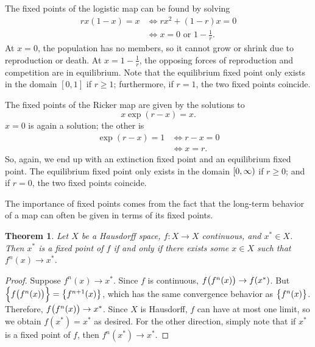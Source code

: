 \documentclass{article}
\theoremstyle{plain}
\newtheorem{theorem}{Theorem}
\theoremstyle{definition}
\DeclarePairedDelimiter{\parensproto}{\lparen}{\rparen}
\newcommand{\parens}{\parensproto*}
\DeclarePairedDelimiter{\rhalfopenproto}{\lbrack}{\rparen}
\newcommand{\rhalfopen}{\rhalfopenproto*}
\begin{document}
\begin{example}
  The fixed points of the logistic map can be found by solving
  \[
    \begin{aligned}
      rx(1 - x) = x
      &\iff rx^2 + (1 - r)x = 0
      \\
      &\iff x = 0 \text{ or } 1 - \frac{1}{r}.
    \end{aligned}
  \]
  At \(x = 0\), the population has no members, so it cannot grow or shrink due to reproduction or death. At \(x = 1 - \frac{1}{r}\), the opposing forces of reproduction and competition are in equilibrium. Note that the equilibrium fixed point only exists in the domain \([0, 1]\) if \(r \ge 1\); furthermore, if \(r = 1\), the two fixed points coincide.
\end{example}

\begin{example}
  The fixed points of the Ricker map are given by the solutions to
  \[
    x\exp(r - x) = x.
  \]
  \(x = 0\) is again a solution; the other is
  \[
    \begin{aligned}
      \exp(r - x) = 1
      &\iff
      r - x = 0
      \\
      &\iff
      x = r.
    \end{aligned}
  \]
  So, again, we end up with an extinction fixed point and an equilibrium fixed point. The equilibrium fixed point only exists in the domain \(\rhalfopen{0, \infty}\) if \(r \ge 0\); and if \(r = 0\), the two fixed points coincide.
\end{example}

The importance of fixed points comes from the fact that the long-term behavior of a map can often be given in terms of its fixed points.

\begin{theorem}\label{theorem:iteration-limit-iff-fixed-point}
  Let \(X\) be a Hausdorff space, \(f : X \to X\) continuous, and \(x^* \in X\). Then \(x^*\) is a fixed point of \(f\) if and only if there exists some \(x \in X\) such that \(f^n(x) \to x^*\).
\end{theorem}
\begin{proof}
  Suppose \(f^n(x) \to x^*\). Since \(f\) is continuous, \(f\parens{f^n(x)} \to f(x^*)\). But \(\set{f\parens{f^n(x)}} = \set{f^{n + 1}(x)}\), which has the same convergence behavior as \(\set{f^n(x)}\). Therefore, \(f\parens{f^n(x)} \to x^*\). Since \(X\) is Hausdorff, \(f\) can have at most one limit, so we obtain \(f(x^*) = x^*\) as desired. For the other direction, simply note that if \(x^*\) is a fixed point of \(f\), then \(f^n(x^*) \to x^*\).
\end{proof}
\end{document}

